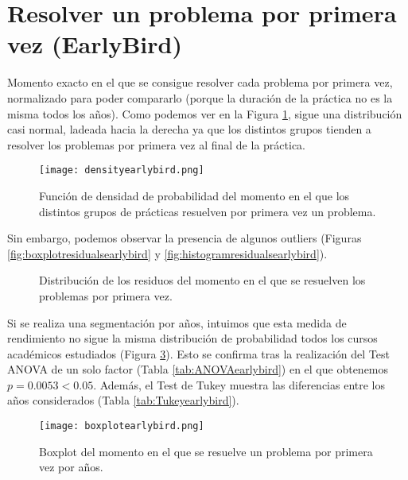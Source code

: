\section{Resolver un problema por primera vez (EarlyBird)}

Momento exacto en el que se consigue resolver cada problema por primera vez, normalizado para poder compararlo (porque la duración de la práctica no es la misma todos los años). Como podemos ver en la Figura \ref{fig:densityplotearlybird}, sigue una distribución casi normal, ladeada hacia la derecha ya que los distintos grupos tienden a resolver los problemas por primera vez al final de la práctica.

\begin{figure}[H]
    \centering
    \texttt{[image: densityearlybird.png]}
    \caption{Función de densidad de probabilidad del momento en el que los distintos grupos de prácticas resuelven por primera vez un problema.}
    \label{fig:densityplotearlybird}
\end{figure}

Sin embargo, podemos observar la presencia de algunos outliers (Figuras \ref{fig:boxplotresidualsearlybird} y \ref{fig:histogramresidualsearlybird}).

\begin{figure}[H]
\centering
{}\qquad
{}
\caption{Distribución de los residuos del momento en el que se resuelven los problemas por primera vez.}
\label{fig:earlybird}
\end{figure}

Si se realiza una segmentación por años, intuimos que esta medida de rendimiento no sigue la misma distribución de probabilidad todos los cursos académicos estudiados (Figura \ref{fig:boxplotearlybird}). Esto se confirma tras la realización del Test ANOVA de un solo factor (Tabla \ref{tab:ANOVAearlybird}) en el que obtenemos $p = 0.0053 < 0.05$. Además, el Test de Tukey muestra las diferencias entre los años considerados (Tabla \ref{tab:Tukeyearlybird}).

\begin{figure}[H]
    \centering
    \texttt{[image: boxplotearlybird.png]}
    \caption{Boxplot del momento en el que se resuelve un problema por primera vez por años.}
    \label{fig:boxplotearlybird}
\end{figure}

